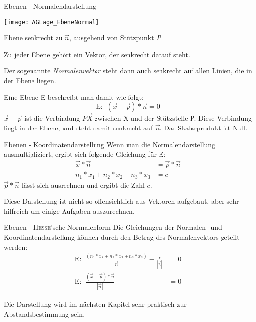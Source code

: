 \begin{bla}{Ebenen - Normalendarstellung}
  \begin{marginfigure}[0em]
    \texttt{[image: AGLage\_EbeneNormal]}
    \caption{Ebene senkrecht zu $\vec{n}$, ausgehend von Stützpunkt $P$}
  \end{marginfigure}
  Zu jeder Ebene gehört ein Vektor, der senkrecht darauf steht.

  Der sogenannte \emph{Normalenvektor} steht dann auch senkrecht auf allen Linien, die in der Ebene liegen.

  Eine Ebene E beschreibt man damit wie folgt:
  \begin{equation*}
    \text{E: }\ \left( \vec{x} - \vec{p} \right) * \vec{n} = 0
  \end{equation*}
  $\vec{x} - \vec{p}$ ist die Verbindung $\overrightarrow{PX}$ zwischen X und der Stützstelle P.
  Diese Verbindung liegt in der Ebene, und steht damit senkrecht auf $\vec{n}$. Das Skalarprodukt ist Null.
\end{bla}



\begin{bla}{Ebenen - Koordinatendarstellung}
  \label{AG:E-Koordinatendarst}
  Wenn man die Normalendarstellung ausmultipliziert, ergibt sich folgende Gleichung für E:
  \begin{align*}
    \vec{x} * \vec{n} &= \vec{p} * \vec{n}\\
    n_1*x_1 + n_2*x_2 + n_3*x_3 &= c
  \end{align*}
  $\vec{p} * \vec{n}$ lässt sich ausrechnen und ergibt die Zahl $c$.

  Diese Darstellung ist nicht so offensichtlich aus Vektoren aufgebaut, aber sehr hilfreich um einige Aufgaben auszurechnen.
\end{bla}

\begin{bla}{Ebenen - \textsc{Hesse}'sche Normalenform}
  Die Gleichungen der Normalen- und Koordinatendarstellung können durch den Betrag des Normalenvektors geteilt werden:
  \begin{align*}
    \text{E: }\ \frac{ \left(n_1*x_1 + n_2*x_2 + n_3*x_3\right)}{|\vec{n}|} - \frac{c}{|\vec{n}|}
    &=
    0
    \\
    \text{E: }\ \frac{\left( \vec{x} - \vec{p} \right) * \vec{n}}{|\vec{n}|}
    &=
    0
  \end{align*}

  Die Darstellung wird im nächsten Kapitel sehr praktisch zur Abstandsbestimmung sein.
\end{bla}


